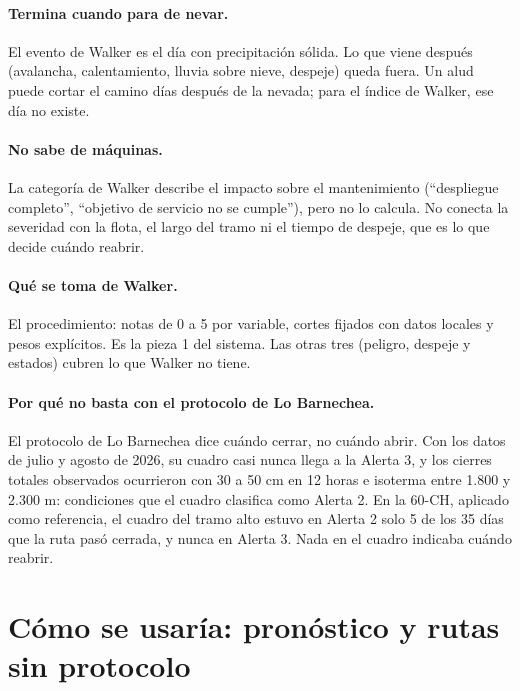 \documentclass[11pt,a4paper]{article}
\begin{document}
\paragraph{Termina cuando para de nevar.} El evento de Walker es el día con precipitación sólida. Lo que viene después (avalancha, calentamiento, lluvia sobre nieve, despeje) queda fuera. Un alud puede cortar el camino días después de la nevada; para el índice de Walker, ese día no existe.

\paragraph{No sabe de máquinas.} La categoría de Walker describe el impacto sobre el mantenimiento (``despliegue completo'', ``objetivo de servicio no se cumple''), pero no lo calcula. No conecta la severidad con la flota, el largo del tramo ni el tiempo de despeje, que es lo que decide cuándo reabrir.

\paragraph{Qué se toma de Walker.} El procedimiento: notas de 0 a 5 por variable, cortes fijados con datos locales y pesos explícitos. Es la pieza 1 del sistema. Las otras tres (peligro, despeje y estados) cubren lo que Walker no tiene.

\paragraph{Por qué no basta con el protocolo de Lo Barnechea.} El protocolo de Lo Barnechea dice cuándo cerrar, no cuándo abrir. Con los datos de julio y agosto de 2026, su cuadro casi nunca llega a la Alerta 3, y los cierres totales observados ocurrieron con 30 a 50 cm en 12 horas e isoterma entre 1.800 y 2.300 m: condiciones que el cuadro clasifica como Alerta 2. En la 60-CH, aplicado como referencia, el cuadro del tramo alto estuvo en Alerta 2 solo 5 de los 35 días que la ruta pasó cerrada, y nunca en Alerta 3. Nada en el cuadro indicaba cuándo reabrir.





\section{Cómo se usaría: pronóstico y rutas sin protocolo}\label{sec:operacion}
\end{document}
